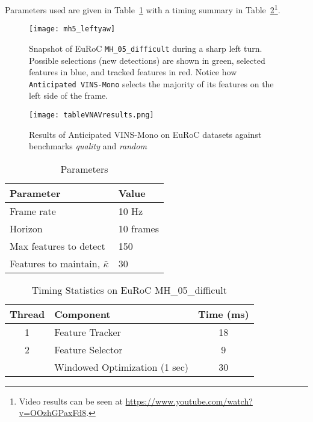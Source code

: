Parameters used are given in Table~\ref{tab:parameters} with a timing summary in Table~\ref{tab:timing}\footnote{Video results can be seen at \url{https://www.youtube.com/watch?v=OOzhGPaxFd8}.}.

\begin{figure}
\centering
\texttt{[image: mh5\_leftyaw]} 
\caption{Snapshot of EuRoC \texttt{MH\_05\_difficult} during a sharp left turn. Possible selections (new detections) are shown in green, selected features in blue, and tracked features in red. Notice how \texttt{Anticipated VINS-Mono} selects the majority of its features on the left side of the frame.}
\label{fig:architecture} 
\end{figure}

\begin{figure}
	\centering
	\texttt{[image: tableVNAVresults.png]} 
	\caption{Results of Anticipated VINS-Mono on EuRoC datasets against benchmarks \textit{quality} and \textit{random}}
	\label{tab:results} 
\end{figure}

\begin{table}[h]
\centering
\caption{Parameters}
\begin{tabular}{ll}
    \toprule
    Parameter & Value \\
    \midrule
    Frame rate & 10 Hz \\
    Horizon & 10 frames \\
    Max features to detect & 150 \\
    Features to maintain, $\bar{\kappa}$ & 30 \\
    \bottomrule
\end{tabular}
\label{tab:parameters}
\end{table}

\begin{table}[h]
\centering
\caption{Timing Statistics on EuRoC MH\_05\_difficult}
\begin{tabular}{clc}
    \toprule
    Thread & Component & Time (ms) \\
    \midrule
    1 & Feature Tracker & 18 \\
    \midrule
    2 & Feature Selector & 9 \\
      & Windowed Optimization (1 sec) & 30 \\
    \bottomrule
\end{tabular}
\label{tab:timing}
\end{table}